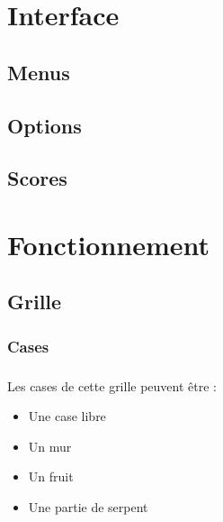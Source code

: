 \documentclass{beamer}
\begin{document}
\section{Interface}
\subsection{Menus}
\begin{frame}
\frametitle{\insertsubsection}
\framesubtitle{\insertsection}

\end{frame}
\subsection{Options}
\begin{frame}
\frametitle{\insertsubsection}
\framesubtitle{\insertsection}

\end{frame}
\subsection{Scores}
\begin{frame}
\frametitle{\insertsubsection}
\framesubtitle{\insertsection}

\end{frame}

\section{Fonctionnement}
\subsection{Grille}
\subsubsection{Cases}
\begin{frame}
\frametitle{\insertsubsubsection}
\framesubtitle{\insertsubsection}
Les cases de cette grille peuvent être :\\
\begin{itemize}
\item Une case libre
\item Un mur
\item Un fruit
\item Une partie de serpent
\end{itemize}
\end{frame}
\end{document}
